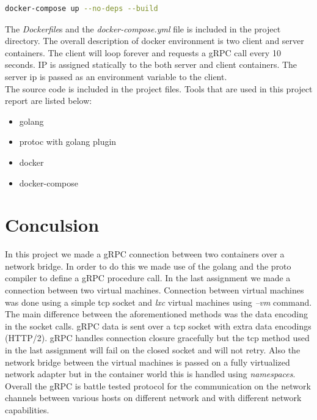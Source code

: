 \documentclass[a4paper, 11pt]{article}
\theoremstyle{nonumberplain}
\begin{document}
\begin{lstlisting}[language=bash]
docker-compose up --no-deps --build
\end{lstlisting}
The \textit{Dockerfile}s and the \textit{docker-compose.yml} file is included
in the project directory. The overall description of docker environment is
two client and server containers. The client will loop forever and requests
a gRPC call every 10 seconds. IP is assigned statically to the both server and
client containers. The server ip is passed as an environment variable to 
the client. \\
The source code is included in the project files.
Tools that are used in this project report are listed below:
\begin{itemize}
    \item golang
    \item protoc with golang plugin
    \item docker
    \item docker-compose
\end{itemize}

\section{Conculsion}
In this project we made a gRPC connection between two containers over a
network bridge. In order to do this we made use of the golang and the proto
compiler to define a gRPC procedure call. In the last assignment we made a
connection between two virtual machines. Connection between virtual machines
was done using a simple tcp socket and \textit{lxc} virtual machines using
\textit{--vm} command. The main difference between the aforementioned methods
was the data encoding in the socket calls. gRPC data is sent over a tcp socket
with extra data encodings (HTTP/2). gRPC handles connection closure gracefully
but the tcp method used in the last assignment will fail on the closed socket
and will not retry. Also the network bridge between the virtual machines is
passed on a fully virtualized network adapter but in the container world this
is handled using \textit{namespaces}. Overall the gRPC is battle tested
protocol for the communication on the network channels between various hosts
on different network and with different network capabilities.




% 
\end{document}
